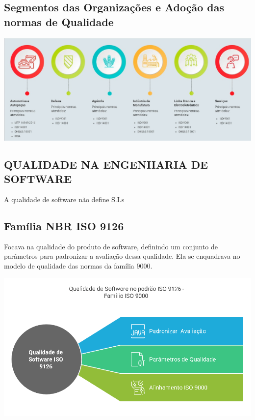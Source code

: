 \documentclass[
]{book}
\begin{document}
\subsection{Segmentos das Organizações e Adoção das normas de Qualidade}\label{segmentos-das-organizauxe7uxf5es-e-adouxe7uxe3o-das-normas-de-qualidade}

\includegraphics{images/qualidade-geral/segmentos.jpg}

\subsection{QUALIDADE NA ENGENHARIA DE SOFTWARE}\label{qualidade-na-engenharia-de-software}

A qualidade de software não define S.I.s

\subsection{Família NBR ISO 9126}\label{famuxedlia-nbr-iso-9126}

Focava na qualidade do produto de software, definindo um conjunto de parâmetros para padronizar a avaliação dessa qualidade. Ela se enquadrava no modelo de qualidade das normas da família 9000.

\includegraphics{images/qualidade-geral/ISO-9126-SGSI.png}
\end{document}
